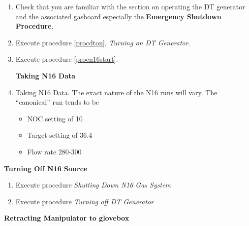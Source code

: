 \begin{enumerate}

\item\checkbox Check that you are familiar with the section on operating the DT generator
and the associated gasboard especially the {\bf Emergency Shutdown Procedure}.


\item \checkbox Execute procedure \ref{procdton}, {\em Turning on DT Generator}.

\item \checkbox Execute procedure \ref{procn16start}.
  

\begin{center}
             {\bf Taking N16 Data}
\end{center}
\item\checkbox Taking N16 Data.
  The exact nature of the N16 runs will vary.  The ``canonical''
  run tends to be 
  \begin{itemize}
  \item NOC setting of 10
  \item Target setting of 36.4
  \item Flow rate 280-300
  \end{itemize}

\end{enumerate}


\begin{center}
             {\bf Turning Off N16 Source}
\end{center}

\begin{enumerate}

\item \checkbox Execute procedure {\em Shutting Down N16 Gas System}
\item \checkbox Execute procedure {\em Turning off DT Generator}

\end{enumerate}


\begin{center}
              {\bf Retracting Manipulator to glovebox}
\end{center}

